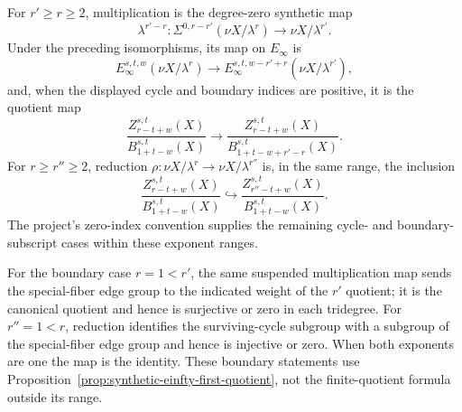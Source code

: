 \begin{proposition}
  \label{prop:synthetic-einfty-map-compatibility}
  \notready
  For $r'\ge r\ge2$, multiplication is the degree-zero synthetic map
  \[
    \lambda^{r'-r}:
    \Sigma^{0,r-r'}(\nu X/\lambda^r)\longrightarrow\nu X/\lambda^{r'}.
  \]
  Under the preceding isomorphisms, its map on $E_\infty$ is
  \[
    E_\infty^{s,t,w}(\nu X/\lambda^r)
      \longrightarrow
    E_\infty^{s,t,w-r'+r}(\nu X/\lambda^{r'}),
  \]
  and, when the displayed cycle and boundary indices are positive, it is the
  quotient map
  \[
    \frac{Z_{r-t+w}^{s,t}(X)}{B_{1+t-w}^{s,t}(X)}
      \longrightarrow
    \frac{Z_{r-t+w}^{s,t}(X)}{B_{1+t-w+r'-r}^{s,t}(X)}.
  \]
  For $r\ge r''\ge2$, reduction
  $\rho:\nu X/\lambda^r\to\nu X/\lambda^{r''}$
  is, in the same range, the inclusion
  \[
    \frac{Z_{r-t+w}^{s,t}(X)}{B_{1+t-w}^{s,t}(X)}
      \hookrightarrow
    \frac{Z_{r''-t+w}^{s,t}(X)}{B_{1+t-w}^{s,t}(X)}.
  \]
  The project's zero-index convention supplies the remaining cycle- and
  boundary-subscript cases within these exponent ranges.

  For the boundary case $r=1<r'$, the same suspended multiplication map sends
  the special-fiber edge group to the indicated weight of the $r'$ quotient;
  it is the canonical quotient and hence is surjective or zero in each
  tridegree.  For $r''=1<r$, reduction identifies the surviving-cycle subgroup
  with a subgroup of the special-fiber edge group and hence is injective or
  zero.  When both exponents are one the map is the identity.  These boundary
  statements use Proposition~\ref{prop:synthetic-einfty-first-quotient}, not
  the finite-quotient formula outside its range.


\end{proposition}
